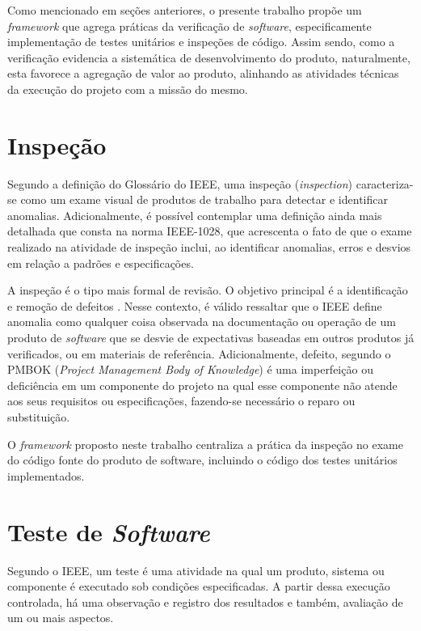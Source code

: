 Como mencionado em seções anteriores, o presente trabalho propõe um \textit{framework} que agrega práticas da verificação de \textit{software}, especificamente implementação de testes unitários e inspeções de código. Assim sendo, como a verificação evidencia a sistemática de desenvolvimento do produto, naturalmente, esta favorece a agregação de valor ao produto, alinhando as atividades técnicas da execução do projeto com a missão do mesmo.

\section{Inspeção}

Segundo a definição do Glossário do IEEE, uma inspeção (\textit{inspection}) caracteriza-se como um exame visual de produtos de trabalho para detectar e identificar anomalias. Adicionalmente, é possível contemplar uma definição ainda mais detalhada que consta na norma IEEE-1028, que acrescenta o fato de que o exame realizado na atividade de inspeção inclui, ao identificar anomalias, erros e desvios em relação a padrões e especificações.

A inspeção é o tipo mais formal de revisão. O objetivo principal é a identificação e remoção de defeitos \cite{paulafilho}. Nesse contexto, é válido ressaltar que o IEEE define anomalia como qualquer coisa observada na documentação ou operação de um produto de \textit{software} que se desvie de expectativas baseadas em outros produtos já verificados, ou em materiais de referência. Adicionalmente, defeito, segundo o PMBOK (\textit{Project Management Body of Knowledge}) é uma imperfeição ou deficiência em um componente do projeto na qual esse componente não atende aos seus requisitos ou especificações, fazendo-se necessário o reparo ou substituição.

O \textit{framework} proposto neste trabalho centraliza a prática da inspeção no exame do código fonte do produto de software, incluindo o código dos testes unitários implementados.

\section{Teste de \textit{Software}}

Segundo o IEEE, um teste é uma atividade na qual um produto, sistema ou componente é executado sob condições especificadas. A partir dessa execução controlada, há uma observação e registro dos resultados e também, avaliação de um ou mais aspectos.

